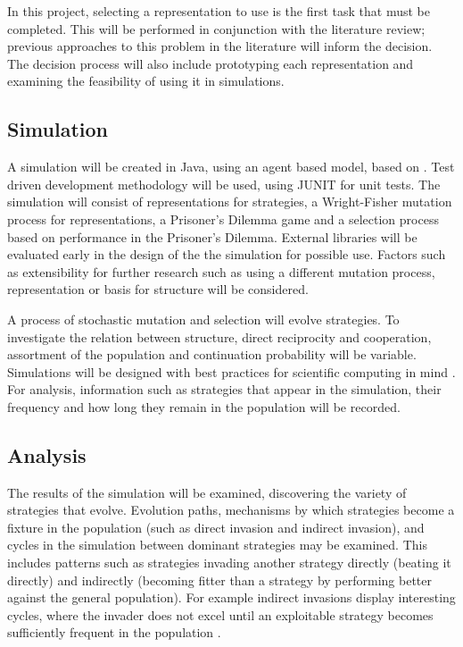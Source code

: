 \documentclass[a4paper,11pt,bcshonoursthesis,singlespace,twoside]{cssethesis}
\begin{document}
In this project, selecting a representation to use is the first task that must be completed. 
This will be performed in conjunction with the literature review; previous approaches to this problem in the literature will inform the decision. 
The decision process will also include prototyping each representation and examining the feasibility of using it in simulations.
\subsection{Simulation}
A simulation will be created in Java, using an agent based model, based on \citet{van-veelen:PNAS:2012}. 
Test driven development methodology will be used, using JUNIT for unit tests. 
The simulation will consist of representations for strategies, a Wright-Fisher mutation process for representations, a Prisoner's Dilemma game and a selection process based on performance in the Prisoner's Dilemma. External libraries will be evaluated early in the design of the the simulation for possible use. 
Factors such as extensibility for further research such as using a different mutation process, representation or basis for structure will be considered. 

A process of stochastic mutation and selection will evolve strategies. 
To investigate the relation between structure, direct reciprocity and cooperation, assortment of the population and continuation probability will be variable. 
Simulations will be designed with best practices for scientific computing in mind \citep{wilson2014best}. 
For analysis, information such as strategies that appear in the simulation, their frequency and how long they remain in the population will be recorded. %
\subsection{Analysis}
The results of the simulation will be examined, discovering the variety of strategies that evolve. 
Evolution paths, mechanisms by which strategies become a fixture in the population (such as direct invasion and indirect invasion), and cycles in the simulation between dominant strategies may be examined. 
This includes patterns such as strategies invading another strategy directly (beating it directly) and indirectly (becoming fitter than a strategy by performing better against the general population). 
For example indirect invasions display interesting cycles, where the invader does not excel until an exploitable strategy becomes sufficiently frequent in the population \citep{van-veelen:PNAS:2012}. 
\end{document}
